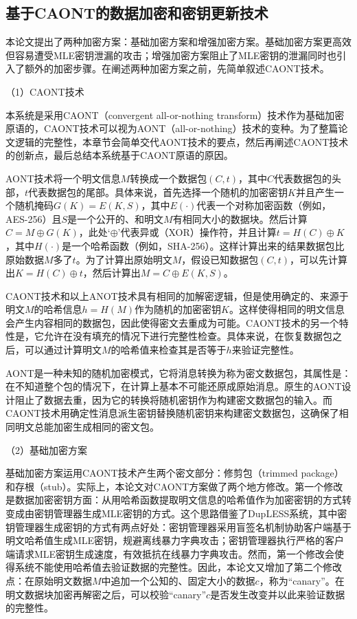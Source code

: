 \documentclass[promaster]{thesis-uestc}
\begin{document}
\subsection{基于CAONT的数据加密和密钥更新技术}\label{基于CAONT的数据加密和密钥更新技术}
本论文提出了两种加密方案：基础加密方案和增强加密方案。基础加密方案更高效但容易遭受MLE密钥泄漏的攻击；增强加密方案阻止了MLE密钥的泄漏同时也引入了额外的加密步骤。在阐述两种加密方案之前，先简单叙述CAONT技术。

（1）CAONT技术

本系统是采用CAONT（convergent all-or-nothing transform）技术作为基础加密原语的，CAONT技术可以视为\acrshort{AONT}（all-or-nothing）技术的变种。为了整篇论文逻辑的完整性，本章节会简单交代AONT技术的要点，然后再阐述CAONT技术的创新点，最后总结本系统基于CAONT原语的原因。

AONT技术将一个明文信息$M$转换成一个数据包$(C, t)$，其中$C$代表数据包的头部，$t$代表数据包的尾部。具体来说，首先选择一个随机的加密密钥$K$并且产生一个随机掩码$G(K) = E(K, S)$，其中$E(\cdot)$代表一个对称加密函数（例如，AES-256）且$S$是一个公开的、和明文$M$有相同大小的数据块。然后计算$C = M \oplus G(K)$，此处‘$\oplus$’代表异或（XOR）操作符，并且计算$t = H(C) \oplus K$，其中$H(\cdot)$是一个哈希函数（例如，SHA-256）。这样计算出来的结果数据包比原始数据$M$多了$t$。为了计算出原始明文$M$，假设已知数据包$(C, t)$，可以先计算出$K = H(C) \oplus t$，然后计算出$M = C \oplus E(K, S)$。

CAONT技术和以上ANOT技术具有相同的加解密逻辑，但是使用确定的、来源于明文$M$的哈希信息$h = H(M)$作为随机的加密密钥$K$。这样使得相同的明文信息会产生内容相同的数据包，因此使得密文去重成为可能。CAONT技术的另一个特性是，它允许在没有填充的情况下进行完整性检查。具体来说，在恢复数据包之后，可以通过计算明文$M$的哈希值来检查其是否等于$h$来验证完整性。

AONT是一种未知的随机加密模式，它将消息转换为称为密文数据包，其属性是：在不知道整个包的情况下，在计算上基本不可能还原成原始消息。原生的AONT设计阻止了数据去重，因为它的转换将随机密钥作为构建密文数据包的输入。而CAONT技术用确定性消息派生密钥替换随机密钥来构建密文数据包，这确保了相同明文总能加密生成相同的密文包。

（2）基础加密方案\label{caont-basic}

基础加密方案运用CAONT技术产生两个密文部分：修剪包（trimmed package）和存根（stub）。实际上，本论文对CAONT方案做了两个地方修改。第一个修改是数据加密密钥方面：从用哈希函数提取明文信息的哈希值作为加密密钥的方式转变成由密钥管理器生成MLE密钥的方式。这个思路借鉴了DupLESS系统，其中密钥管理器生成密钥的方式有两点好处：密钥管理器采用盲签名机制协助客户端基于明文哈希值生成MLE密钥，规避离线暴力字典攻击；密钥管理器执行严格的客户端请求MLE密钥生成速度，有效抵抗在线暴力字典攻击。然而，第一个修改会使得系统不能使用哈希值去验证数据的完整性。因此，本论文又增加了第二个修改点：在原始明文数据$M$中追加一个公知的、固定大小的数据$c$，称为“canary”。在明文数据块加密再解密之后，可以校验“canary”$c$是否发生改变并以此来验证数据的完整性。
\end{document}
